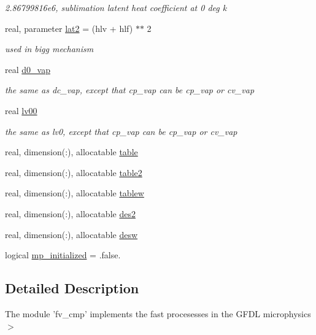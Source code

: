 \begin{DoxyCompactItemize}
\begin{DoxyCompactList}\small\item\em 2.\-86799816e6, sublimation latent heat coefficient at 0 deg k \end{DoxyCompactList}\item 
real, parameter \hyperlink{classfv__cmp__mod_aad5bf68c9e846169feaa2355a29ec7ae}{lat2} = (hlv + hlf) $\ast$$\ast$ 2
\begin{DoxyCompactList}\small\item\em used in bigg mechanism \end{DoxyCompactList}\item 
real \hyperlink{classfv__cmp__mod_ac3f9f88a1d49ff1e327bbb8005f9228a}{d0\-\_\-vap}
\begin{DoxyCompactList}\small\item\em the same as dc\-\_\-vap, except that cp\-\_\-vap can be cp\-\_\-vap or cv\-\_\-vap \end{DoxyCompactList}\item 
real \hyperlink{classfv__cmp__mod_a7bcead849f7cab25637af6d3b1db833a}{lv00}
\begin{DoxyCompactList}\small\item\em the same as lv0, except that cp\-\_\-vap can be cp\-\_\-vap or cv\-\_\-vap \end{DoxyCompactList}\item 
real, dimension(\-:), allocatable \hyperlink{classfv__cmp__mod_a7a34f8d4c0eefd0e66de45d280bb0ba4}{table}
\item 
real, dimension(\-:), allocatable \hyperlink{classfv__cmp__mod_a16427443f0f4cc4376e7a7af841cc03d}{table2}
\item 
real, dimension(\-:), allocatable \hyperlink{classfv__cmp__mod_a308d1b16faf8b0f7c53fb4ace71f326e}{tablew}
\item 
real, dimension(\-:), allocatable \hyperlink{classfv__cmp__mod_a39a88a1e472449c87b0c18c5be0682a2}{des2}
\item 
real, dimension(\-:), allocatable \hyperlink{classfv__cmp__mod_ae014434a6d863ca10c5961edfd866425}{desw}
\item 
logical \hyperlink{classfv__cmp__mod_af9c43700533ec209e98ed9aaea7220ad}{mp\-\_\-initialized} = .false.
\end{DoxyCompactItemize}


\subsection{Detailed Description}
The module 'fv\-\_\-cmp' implements the fast procesesses in the G\-F\-D\-L microphysics $>$ 


